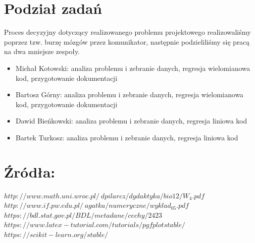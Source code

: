 \documentclass{article}
\begin{document}
\section{Podział zadań}
Proces decyzyjny dotyczący realizowanego problemu projektowego realizowaliśmy poprzez tzw. burzę mózgów przez komunikator, następnie podzieliliśmy się pracą na dwa mniejsze zespoły.
\begin{itemize}
    \item Michał Kotowski:
    analiza problemu i zebranie danych, regresja wielomianowa kod, przygotowanie dokumentacji
    \item Bartosz Górny:
    analiza problemu i zebranie danych, regresja wielomianowa kod, przygotowanie dokumentacji
    \item Dawid Bieńkowski:
    analiza problemu i zebranie danych, regresja liniowa kod
    \item Bartek Turkosz:
    analiza problemu i zebranie danych, regresja liniowa kod
\end{itemize}
\section{Źródła:}
\textit{$http://www.math.uni.wroc.pl/~dpilarcz/dydaktyka/bio12/W_4.pdf$}\\
\textit{$http://www.if.pw.edu.pl/~agatka/numeryczne/wyklad_05.pdf$}\\
\textit{$https://bdl.stat.gov.pl/BDL/metadane/cechy/2423$}\\
\textit{$https://www.latex-tutorial.com/tutorials/pgfplotstable/$}\\
\textit{$https://scikit-learn.org/stable/$}\\
\end{document}
